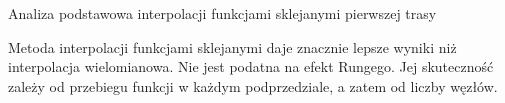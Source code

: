 \documentclass{article}
\begin{document}
\begin{section}{Analiza podstawowa interpolacji funkcjami sklejanymi pierwszej trasy}
  \begin{figure}[H]
    \centering
  \end{figure}
  \begin{figure}[H]
    \centering
  \end{figure}

  Metoda interpolacji funkcjami sklejanymi daje znacznie lepsze wyniki niż interpolacja wielomianowa. Nie jest podatna na
  efekt Rungego. Jej skuteczność zależy od przebiegu funkcji w każdym podprzedziale, a zatem od liczby węzłów.
\end{section}
\end{document}
